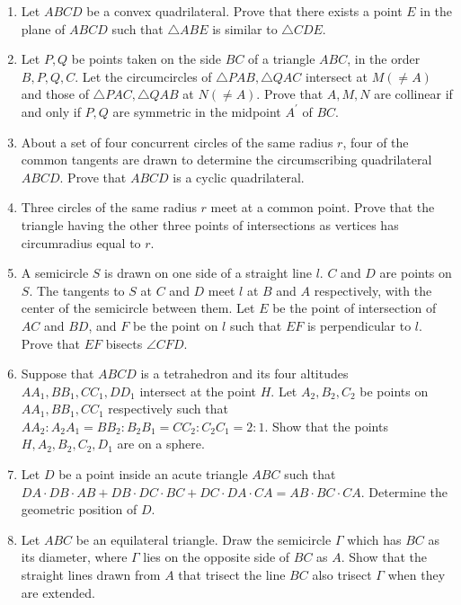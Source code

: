 \documentclass[12pt]{scrartcl}
\begin{document}
\begin{enumerate}[resume]
    \item Let $ABCD$ be a convex quadrilateral. Prove that there exists a point $E$ in the plane of $ABCD$ such that $\triangle ABE$ is similar to $\triangle CDE$.

    \item Let $P, Q$ be points taken on the side $BC$ of a triangle $ABC$, in the order $B, P, Q, C$. Let the circumcircles of $\triangle PAB, \triangle QAC$ intersect at $M (\ne A)$ and those of $\triangle PAC, \triangle QAB$ at $N (\ne A)$. Prove that $A, M, N$ are collinear if and only if $P, Q$ are symmetric in the midpoint $A^{\prime}$ of $BC$.

    \item About a set of four concurrent circles of the same radius $r$, four of the common tangents are drawn to determine the circumscribing quadrilateral $ABCD$. Prove that $ABCD$ is a cyclic quadrilateral.

    \item Three circles of the same radius $r$ meet at a common point. Prove that the triangle having the other three points of intersections as vertices has circumradius equal to $r$.

    \item A semicircle $S$ is drawn on one side of a straight line $l$. $C$ and $D$ are points on $S$. The tangents to $S$ at $C$ and $D$ meet $l$ at $B$ and $A$ respectively, with the center of the semicircle between them. Let $E$ be the point of intersection of $AC$ and $BD$, and $F$ be the point on $l$ such that $EF$ is perpendicular to $l$. Prove that $EF$ bisects $\angle CFD$.

    \item Suppose that $ABCD$ is a tetrahedron and its four altitudes $AA_{1}, BB_{1}, CC_{1}, DD_{1}$ intersect at the point $H$. Let $A_{2}, B_{2}, C_{2}$ be points on $AA_{1}, BB_{1}, CC_{1}$ respectively such that $AA_{2}:A_{2}A_{1}=BB_{2}:B_{2}B_{1}=CC_{2}:C_{2}C_{1}=2:1.$ Show that the points $H, A_{2}, B_{2}, C_{2}, D_{1}$ are on a sphere.

    \item Let $D$ be a point inside an acute triangle $ABC$ such that $DA\cdot DB\cdot AB+DB\cdot DC\cdot BC+DC\cdot DA\cdot CA=AB\cdot BC\cdot CA.$ Determine the geometric position of $D$.

    \item Let $ABC$ be an equilateral triangle. Draw the semicircle $\Gamma$ which has $BC$ as its diameter, where $\Gamma$ lies on the opposite side of $BC$ as $A$. Show that the straight lines drawn from $A$ that trisect the line $BC$ also trisect $\Gamma$ when they are extended.


\end{enumerate}
\end{document}
